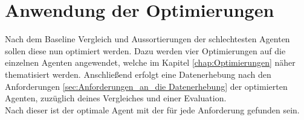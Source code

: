 \section{Anwendung der Optimierungen}
Nach dem Baseline Vergleich und Aussortierungen der schlechtesten Agenten sollen diese nun optimiert werden.
Dazu werden vier Optimierungen auf die einzelnen Agenten angewendet, welche im Kapitel \ref{chap:Optimierungen} näher thematisiert werden. 
Anschließend erfolgt eine Datenerhebung nach den Anforderungen \ref{sec:Anforderungen_an_die Datenerhebung} der optimierten Agenten, zuzüglich deines Vergleiches und einer Evaluation.\\
Nach dieser ist der optimale Agent mit der für jede Anforderung gefunden sein.